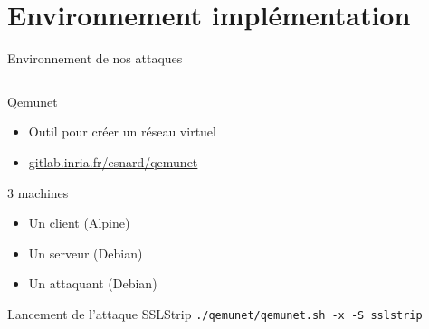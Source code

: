\section{Environnement implémentation}


\begin{frame}[fragile]{Environnement de nos attaques}
  \begin{columns}
    \begin{column}{0.5\textwidth}
      \begin{block}{Qemunet}
        \begin{itemize}
        \item Outil pour créer un réseau virtuel
        \item \url{gitlab.inria.fr/esnard/qemunet}
        \end{itemize}
      \end{block}

      \begin{exampleblock}{3 machines}
        \begin{itemize}
        \item Un client (Alpine)
        \item Un serveur (Debian)
        \item Un attaquant (Debian)
        \end{itemize}
      \end{exampleblock}

      \begin{exampleblock}{Lancement de l'attaque SSLStrip}
        \verb+./qemunet/qemunet.sh -x -S sslstrip+

      \end{exampleblock}

    \end{column}


\end{columns}
\end{frame}
